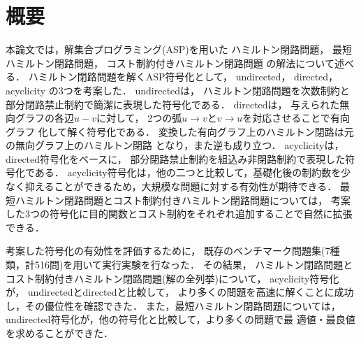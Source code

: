 \chapter*{概要}



本論文では，解集合プログラミング(ASP)を用いた
ハミルトン閉路問題，
最短ハミルトン閉路問題，
コスト制約付きハミルトン閉路問題
の解法について述べる．
%
ハミルトン閉路問題を解くASP符号化として，
\textsf{undirected}，
\textsf{directed}，
\textsf{acyclicity}
の3つを考案した．
\textsf{undirected}は，
ハミルトン閉路問題を次数制約と部分閉路禁止制約で簡潔に表現した符号化である．
\textsf{directed}は，
与えられた無向グラフの各辺$u-v$に対して，
2つの弧$u\rightarrow v$と$v\rightarrow u$を対応させることで有向グラフ
化して解く符号化である．
変換した有向グラフ上のハミルトン閉路は元の無向グラフ上のハミルトン閉路
となり，また逆も成り立つ．
\textsf{acyclicity}は，\textsf{directed}符号化をベースに，
部分閉路禁止制約を組込み非閉路制約で表現した符号化である．
\textsf{acyclicity}符号化は，他の二つと比較して，基礎化後の制約数を少
なく抑えることができるため，大規模な問題に対する有効性が期待できる．
最短ハミルトン閉路問題とコスト制約付きハミルトン閉路問題については，
考案した3つの符号化に目的関数とコスト制約をそれぞれ追加することで自然に拡張できる．

考案した符号化の有効性を評価するために，
既存のベンチマーク問題集(7種類，計516問)を用いて実行実験を行なった．
その結果，
ハミルトン閉路問題とコスト制約付きハミルトン閉路問題(解の全列挙)について，
\textsf{acyclicity}符号化が，
\textsf{undirected}と\textsf{directed}と比較して，
より多くの問題を高速に解くことに成功し，その優位性を確認できた．
また，最短ハミルトン閉路問題については，
\textsf{undirected}符号化が，他の符号化と比較して，より多くの問題で最
適値・最良値を求めることができた．



